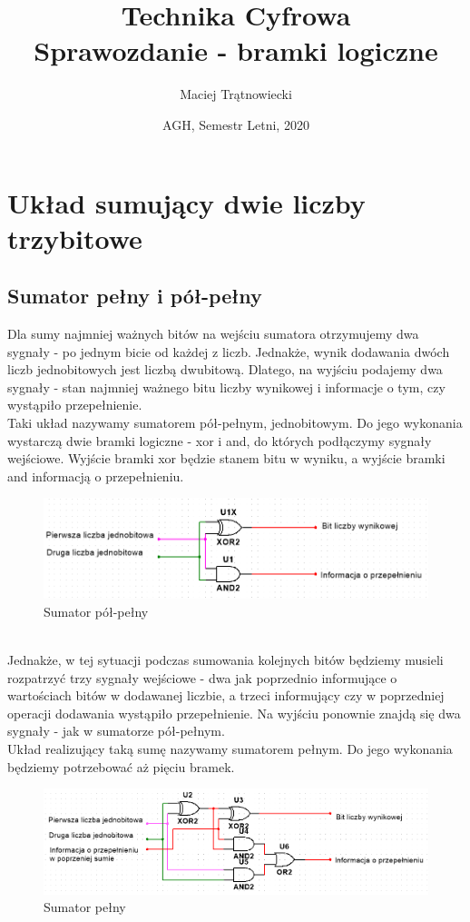 \documentclass{article}
\title{Technika Cyfrowa\\
Sprawozdanie - bramki logiczne}
\author{Maciej Trątnowiecki}
\date{AGH, Semestr Letni, 2020}
\begin{document}
    \maketitle
    \section{Układ sumujący dwie liczby trzybitowe}
        \subsection{Sumator pełny i pół-pełny}
            Dla sumy najmniej ważnych bitów na wejściu sumatora otrzymujemy dwa sygnały - po jednym bicie od każdej z liczb. Jednakże, wynik dodawania dwóch liczb jednobitowych jest liczbą dwubitową. Dlatego, na wyjściu podajemy dwa sygnały - stan najmniej ważnego bitu liczby wynikowej i informacje o tym, czy wystąpiło przepełnienie.\\
            Taki układ nazywamy sumatorem pół-pełnym, jednobitowym. Do jego wykonania wystarczą dwie bramki logiczne - xor i and, do których podłączymy sygnały wejściowe. Wyjście bramki xor będzie stanem bitu w wyniku, a wyjście bramki and informacją o przepełnieniu. \\
            \begin{figure}[h!]
                \centering
                \includegraphics[width=13cm]{reports/img/Z1A_polpelny.png}
                \caption{Sumator pół-pełny}
            \end{figure}\\
            \FloatBarrier
            Jednakże, w tej sytuacji podczas sumowania kolejnych bitów będziemy musieli rozpatrzyć trzy sygnały wejściowe - dwa jak poprzednio informujące o wartościach bitów w dodawanej liczbie, a trzeci informujący czy w poprzedniej operacji dodawania wystąpiło przepełnienie. Na wyjściu ponownie znajdą się dwa sygnały - jak w sumatorze pół-pełnym.\\
            Układ realizujący taką sumę nazywamy sumatorem pełnym. Do jego wykonania będziemy potrzebować aż pięciu bramek. 
            \begin{figure}[h!]
                \centering
                \includegraphics[width=13cm]{reports/img/Z1A_pelny.png}
                \caption{Sumator pełny}
            \end{figure}\\
\end{document}
